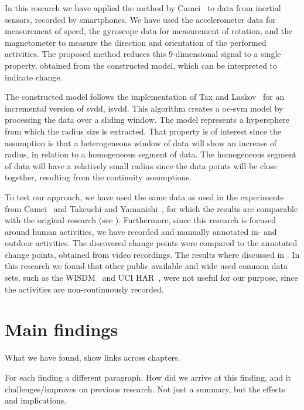 In this research we have applied the method by Camci~\cite{camci2010change} to data from inertial sensors, recorded by smartphones.
We have used the accelerometer data for measurement of speed, the gyroscope data for measurement of rotation, and the magnetometer to measure the direction and orientation of the performed activities.
The proposed method reduces this 9-dimensional signal to a single property, obtained from the constructed model, which can be interpreted to indicate change.

The constructed model follows the implementation of Tax and Laskov~\cite{tax2003online} for an incremental version of \gls{svdd}, \gls{isvdd}.
This algorithm creates a \gls{oc-svm} model by processing the data over a sliding window.
The model represents a hypersphere from which the radius size is extracted.
That property is of interest since the assumption is that a heterogeneous window of data will show an increase of radius, in relation to a homogeneous segment of data.
The homogeneous segment of data will have a relatively small radius since the data points will be close together, resulting from the continuity assumptions.

To test our approach, we have used the same data as used in the experiments from Camci~\cite{camci2010change} and Takeuchi and Yamanishi~\cite{takeuchi2006unifying}, for which the results are comparable with the original research (see ).
Furthermore, since this research is focused around human activities, we have recorded and manually annotated in- and outdoor activities.
The discovered change points were compared to the annotated change points, obtained from video recordings.
The results where discussed in .
In this research we found that other public available and wide used common data sets, such as the WISDM~\cite{kwapisz2011activity} and UCI HAR~\cite{anguita2012human}, were not useful for our purpose, since the activities are non-continuously recorded.




\section{Main findings}
What we have found, show links across chapters.

For each finding a different paragraph.
How did we arrive at this finding, and it challenges/improves on previous research.
Not just a summary, but the effects and implications.


